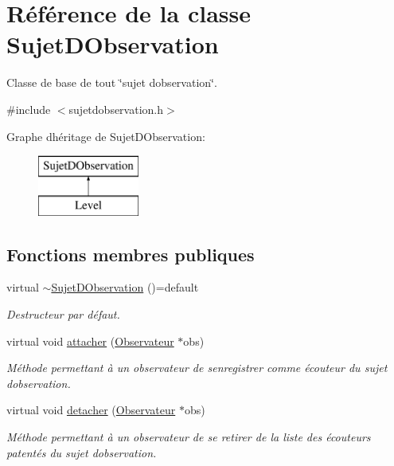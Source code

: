 \hypertarget{class_sujet_d_observation}{}\section{Référence de la classe Sujet\+D\+Observation}
\label{class_sujet_d_observation}


Classe de base de tout \char`\"{}sujet d\textquotesingle{}observation\char`\"{}.  




{\ttfamily \#include $<$sujetdobservation.\+h$>$}

Graphe d\textquotesingle{}héritage de Sujet\+D\+Observation\+:\begin{figure}[H]
\begin{center}
\leavevmode
\includegraphics[height=2.000000cm]{class_sujet_d_observation}
\end{center}
\end{figure}
\subsection*{Fonctions membres publiques}
\begin{DoxyCompactItemize}
\item 
\mbox{\label{class_sujet_d_observation_a7dea5b7feaec2bb1b33014e449acddac}} 
virtual \mbox{\hyperlink{class_sujet_d_observation_a7dea5b7feaec2bb1b33014e449acddac}{$\sim$\+Sujet\+D\+Observation}} ()=default
\begin{DoxyCompactList}\small\item\em Destructeur par défaut. \end{DoxyCompactList}\item 
virtual void \mbox{\hyperlink{class_sujet_d_observation_a697269174b77f64d270e839ab5557a1e}{attacher}} (\mbox{\hyperlink{class_observateur}{Observateur}} $\ast$obs)
\begin{DoxyCompactList}\small\item\em Méthode permettant à un observateur de s\textquotesingle{}enregistrer comme écouteur du sujet d\textquotesingle{}observation. \end{DoxyCompactList}\item 
virtual void \mbox{\hyperlink{class_sujet_d_observation_a05e8d7285a4f1c79d9f53e274653ea1b}{detacher}} (\mbox{\hyperlink{class_observateur}{Observateur}} $\ast$obs)
\begin{DoxyCompactList}\small\item\em Méthode permettant à un observateur de se retirer de la liste des écouteurs patentés du sujet d\textquotesingle{}observation. \end{DoxyCompactList}\end{DoxyCompactItemize}

